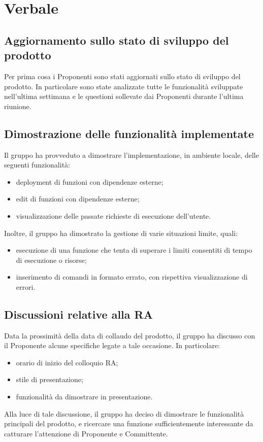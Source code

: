 \section{Verbale}
\subsection{Aggiornamento sullo stato di sviluppo del prodotto}
Per prima cosa i Proponenti sono stati aggiornati sullo stato di sviluppo del prodotto. In particolare sono state analizzate tutte le funzionalità sviluppate nell'ultima settimana e le questioni sollevate dai Proponenti durante l'ultima riunione. 

\subsection{Dimostrazione delle funzionalità implementate}
Il gruppo ha provveduto a dimostrare l'implementazione, in ambiente locale, delle seguenti funzionalità:
\begin{itemize}
	\item deployment di funzioni con dipendenze esterne;
	\item edit di funzioni con dipendenze esterne;
	\item visualizzazione delle passate richieste di esecuzione dell'utente.
\end{itemize}
Inoltre, il gruppo ha dimostrato la gestione di varie situazioni limite, quali:
\begin{itemize}
	\item esecuzione di una funzione che tenta di superare i limiti consentiti di tempo di esecuzione o risorse;
	\item inserimento di comandi in formato errato, con rispettiva visualizzazione di errori.
\end{itemize}

\subsection{Discussioni relative alla RA}
Data la prossimità della data di collaudo del prodotto, il gruppo ha discusso con il Proponente alcune specifiche legate a tale occasione. In particolare:
\begin{itemize}
	\item orario di inizio del colloquio RA;
	\item stile di presentazione;
	\item funzionalità da dimostrare in presentazione.
\end{itemize}
Alla luce di tale discussione, il gruppo ha deciso di dimostrare le funzionalità principali del prodotto, e ricercare una funzione sufficientemente interessante da catturare l'attenzione di Proponente e Committente.
